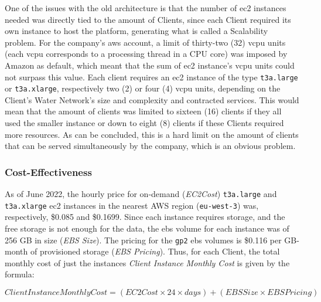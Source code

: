 
One of the issues with the old architecture is that the number of \gls{ec2} instances needed was directly tied to the amount of Clients, since each Client required its own instance to host the platform, generating what is called a Scalability problem. For the company's \gls{aws} account, a limit of thirty-two (32) \gls{vcpu} units (each \gls{vcpu} corresponds to a processing thread in a CPU core) was imposed by Amazon as default, which meant that the sum of \gls{ec2} instance's \gls{vcpu} units could not surpass this value. Each client requires an \gls{ec2} instance of the type \texttt{t3a.large} or \texttt{t3a.xlarge}, respectively two (2) or four (4) \gls{vcpu} units, depending on the Client's Water Network's size and complexity and contracted services. This would mean that the amount of clients was limited to sixteen (16) clients if they all used the smaller instance or down to eight (8) clients if these Clients required more resources. As can be concluded, this is a hard limit on the amount of clients that can be served simultaneously by the company, which is an obvious problem.


\subsubsection{Cost-Effectiveness}\label{methodology:sss:cost-effectiveness}

As of June 2022, the hourly price for on-demand (\textit{EC2Cost}) \texttt{t3a.large} and \texttt{t3a.xlarge} \gls{ec2} instances in the nearest AWS region (\texttt{eu-west-3}) was, respectively, \$0.085 and \$0.1699. Since each instance requires storage, and the free storage is not enough for the data, the \gls{ebs} volume for each instance was of 256 GB in size (\textit{EBS Size}). The pricing for the \texttt{gp2} \gls{ebs} volumes is \$0.116 per GB-month of provisioned storage (\textit{EBS Pricing}). 
Thus, for each Client, the total monthly cost of just the instances \textit{Client Instance Monthly Cost} is given by the formula:

\begin{equation}
    \label{eq:ec2-instance-cost}
    Client Instance Monthly Cost = ( EC2 Cost \times 24 \times  days) + (EBS Size \times  EBS Pricing )
    \end{equation}

